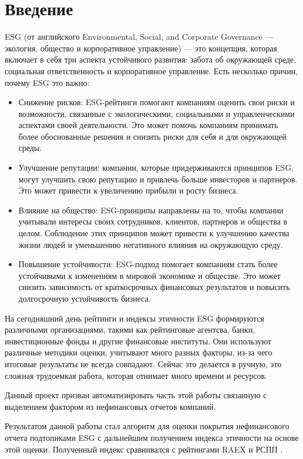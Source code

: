 \documentclass[a4paper, 14pt]{extarticle}
\begin{document}
\section{Введение}
ESG (от английского Environmental, Social, and Corporate Governance — экология, общество и корпоративное управление) --- это концепция, которая включает в себя три аспекта устойчивого развития: забота об окружающей среде, социальная ответственность и корпоративное управление. Есть несколько причин, почему ESG это важно:
\begin{itemize}
    \item Снижение рисков: ESG-рейтинги помогают компаниям оценить свои риски и возможности, связанные с экологическими, социальными и управленческими аспектами своей деятельности. Это может помочь компаниям принимать более обоснованные решения и снизить риски для себя и для окружающей среды.
    \item Улучшение репутации: компании, которые придерживаются принципов ESG, могут улучшить свою репутацию и привлечь больше инвесторов и партнеров. Это может привести к увеличению прибыли и росту бизнеса.
    \item Влияние на общество: ESG-принципы направлены на то, чтобы компании учитывали интересы своих сотрудников, клиентов, партнеров и общества в целом. Соблюдение этих принципов может привести к улучшению качества жизни людей и уменьшению негативного влияния на окружающую среду.
    \item Повышение устойчивости: ESG-подход помогает компаниям стать более устойчивыми к изменениям в мировой экономике и обществе. Это может снизить зависимость от краткосрочных финансовых результатов и повысить долгосрочную устойчивость бизнеса.
\end{itemize}

На сегодняшний день рейтинги и индексы этичности ESG формируются различными организациями, такими как рейтинговые агентсва, банки, инвестиционные фонды и другие финансовые институты. Они используют различные методики оценки, учитывают много разных факторы, из-за чего итоговые результаты не всегда совпадают. Сейчас это делается в ручную, это сложная трудоемкая работа, которая отнимает много времени и ресурсов.

Данный проект призван автоматизировать часть этой работы связанную с выделением фактором из нефинансовых отчетов компаний.

Результатом данной работы стал алгоритм для оценки покрытия нефинансового отчета подтопиками ESG с дальнейшим получением индекса этичности на основе этой оценки. Полученный индекс сравнивался с рейтингами RAEX \cite{link:raex-methodik} и РСПП \cite{link:rspp-methodik}. 
\end{document}
